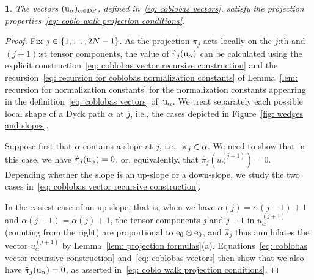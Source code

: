 \documentclass[oneside,english]{amsart}
\numberwithin{equation}{section}
\numberwithin{figure}{section}
\theoremstyle{plain}
\theoremstyle{plain}
\theoremstyle{plain}
\theoremstyle{remark}
\theoremstyle{plain}
\newtheorem{prop}[lem]{\protect\propositionname}
\theoremstyle{plain}
\theoremstyle{plain}
\theoremstyle{plain}
\theoremstyle{plain}
\theoremstyle{plain}
\theoremstyle{plain}
\theoremstyle{plain}
\providecommand{\propositionname}{Proposition}
\begin{document}
\begin{prop}\label{prop: coblo walk projection properties}
The vectors $( \mathrm{u}_\alpha )_{\alpha \in \mathrm{DP}}$, 
defined in~\eqref{eq: coblobas vectors}, 
satisfy the projection properties~\eqref{eq: coblo walk projection conditions}.
\end{prop}
\begin{proof}
Fix $j\in\left\{ 1,\ldots,2N-1\right\}$. As the projection $\pi_j$ acts locally
on the $j$:th and $(j+1)$:st tensor components, the value of 
$\hat{\pi}_j(\mathrm{u}_\alpha)$ can be calculated using 
the explicit construction~\eqref{eq: coblobas vector recursive construction} 
and the %
recursion~\eqref{eq: recursion for coblobas normalization constants} of 
Lemma~\ref{lem: recursion for normalization constants} for the normalization 
constants appearing in the definition~\eqref{eq: coblobas vectors} 
of~$\mathrm{u}_\alpha$.
We treat separately each possible local shape of a Dyck path $\alpha$
at $j$, i.e., the cases depicted in Figure~\ref{fig: wedges and slopes}.

Suppose first that $\alpha$ contains a slope 
at $j$, i.e., $\times_j \in \alpha$.
We need to show that in this case, we have 
$\hat{\pi}_j(\mathrm{u}_\alpha) = 0$, or, equivalently, that
$\hat{\pi}_j(u_{\alpha}^{(j+1)}) = 0$. 
Depending whether the slope is an up-slope or a down-slope,
we study the two cases in~\eqref{eq: coblobas vector recursive construction}.

In the easiest case of an up-slope, that is, when we have $\alpha(j) = \alpha(j-1)+1$ and 
$\alpha(j+1) = \alpha(j)+1$, the tensor components $j$ and $j+1$ in 
$u_{\alpha}^{(j+1)}$ (counting from the right)
are proportional to $\mathrm{e}_0 \otimes \mathrm{e}_0$,
and $\hat{\pi}_j$ thus annihilates the vector $u_{\alpha}^{(j+1)}$ 
by Lemma~\ref{lem: projection formulas}(a). 
Equations~\eqref{eq: coblobas vector recursive construction} 
and~\eqref{eq: coblobas vectors} then show that we also have
$\hat{\pi}_j(\mathrm{u}_\alpha) = 0$, as asserted in~\eqref{eq: coblo walk projection conditions}.


\end{proof}
\end{document}
